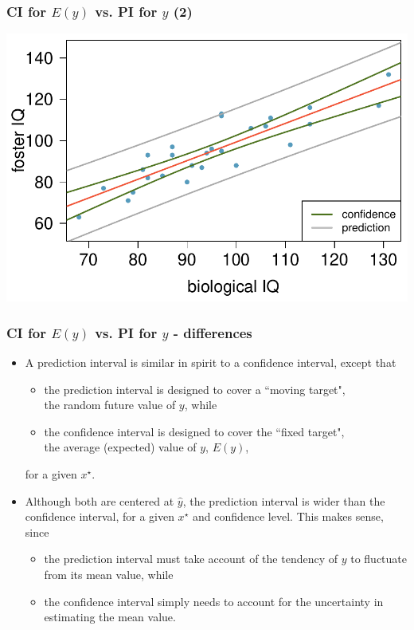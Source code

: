\documentclass[11pt,containsverbatim,handout,xcolor=xelatex,dvipsnames,table]{beamer}
\begin{document}

\begin{frame}
\frametitle{CI for $E(y)$ vs. PI for $y$ (2)}

\begin{center}
\includegraphics[width=\textwidth]{figures/twins/twins_IQ_cint_pint}
\end{center}

\end{frame}



\begin{frame}
\frametitle{CI for $E(y)$ vs. PI for $y$ - differences}

\begin{itemize}

\item A prediction interval is similar in spirit to a confidence interval, except that 
\pause
\begin{itemize}
\item the prediction interval is designed to cover a ``moving target", \\
the random future value of $y$, while
\pause
\item the confidence interval is designed to cover the ``fixed target", \\
the average (expected) value of $y$, $E(y)$,
\end{itemize}
for a given $x^\star$.

\pause

\item Although both are centered at $\hat{y}$, the prediction interval is wider than the confidence interval, for a given $x^\star$ and confidence level. This makes sense, since
\pause
\begin{itemize}
\item the prediction interval must take account of the tendency of $y$ to fluctuate from its mean value, while 
\pause
\item the confidence interval simply needs to account for the uncertainty in estimating the mean value.
\end{itemize}

\end{itemize}

\end{frame}
\end{document}
